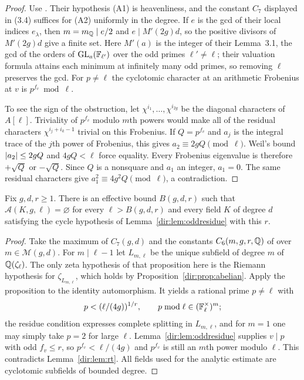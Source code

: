 \begin{proof}
Use \cite[Corollary~3.2, (3.4), Lemma~3.5, \S4.1, Proposition~4.2]{RasmussenTamagawa2017Arithmetic}.
Their hypothesis (A1) is heavenliness, and the constant $C_7$ displayed in (3.4)
suffices for (A2) uniformly in the degree. If $e$ is the gcd of their local indices
$e_\lambda$, then $m=m_{\mathbb{Q}}\mid e/2$ and $e\mid M'(2g)d$, so the positive divisors of
$M'(2g)d$ give a finite set. Here $M'(a)$ is the integer of their Lemma~3.1, the gcd
of the orders of $\operatorname{GL}_a(\mathbb{F}_{\ell'})$ over the odd primes $\ell'\ne\ell$; their
valuation formula attains each minimum at infinitely many odd primes, so removing
$\ell$ preserves the gcd. For $p\ne\ell$ the cyclotomic character at an arithmetic
Frobenius at $v$ is $p^{f_v}\bmod\ell$.

To see the sign of the obstruction, let $\chi^{i_1},\dots,\chi^{i_{2g}}$ be the
diagonal characters of $A[\ell]$. Triviality of $p^{f_v}$ modulo $m$th powers would
make all of the residual characters $\chi^{i_j+i_k-1}$ trivial on this Frobenius. If
$Q=p^{f_v}$ and $a_j$ is the integral trace of the $j$th power of Frobenius, this gives
$a_2\equiv2gQ\pmod\ell$. Weil's bound $\lvert a_2\rvert\le2gQ$ and $4gQ<\ell$ force equality.
Every Frobenius eigenvalue is therefore $+\sqrt Q$ or $-\sqrt Q$. Since $Q$ is a
nonsquare and $a_1$ an integer, $a_1=0$. The same residual characters give
$a_1^2\equiv4g^2Q\pmod\ell$, a contradiction.
\end{proof}

\begin{theorem}\label{dir:thm:heavenlygeneral}
Fix $g,d,r\ge1$. There is an effective bound $B(g,d,r)$ such that
$\mathcal A(K,g,\ell)=\varnothing$ for every $\ell>B(g,d,r)$ and every field $K$ of
degree $d$ satisfying the cycle hypothesis of Lemma~\ref{dir:lem:oddresidue} with this $r$.
\end{theorem}

\begin{proof}
Take the maximum of $C_7(g,d)$ and the constants $C_6(m,g,r,\mathbb{Q})$ of
\cite[Proposition~2.7]{RasmussenTamagawa2017Arithmetic} over $m\in\mathcal M(g,d)$.
For $m\mid\ell-1$ let $L_{m,\ell}$ be the unique subfield of degree $m$ of
$\mathbb{Q}(\zeta_\ell)$. The only zeta hypothesis of that proposition here is the Riemann
hypothesis for $\zeta_{L_{m,\ell}}$, which holds by Proposition~\ref{dir:prop:abelian}. Apply the
proposition to the identity automorphism. It yields a rational prime $p\ne\ell$ with
\[
 p<(\ell/(4g))^{1/r},\qquad p\bmod\ell\in(\mathbb{F}_\ell^\times)^m ;
\]
the residue condition expresses complete splitting in $L_{m,\ell}$, and for $m=1$ one
may simply take $p=2$ for large $\ell$. Lemma~\ref{dir:lem:oddresidue} supplies $v\mid p$
with odd $f_v\le r$, so $p^{f_v}<\ell/(4g)$ and $p^{f_v}$ is still an $m$th power
modulo $\ell$. This contradicts Lemma~\ref{dir:lem:rt}. All fields used for the analytic
estimate are cyclotomic subfields of bounded degree.
\end{proof}

